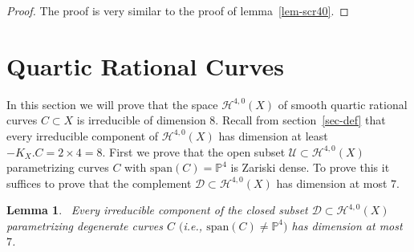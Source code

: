 \documentclass[twoside,12pt,reqno]{amsart}
\theoremstyle{plain}
\newtheorem{lem}[thm]{Lemma}
\theoremstyle{definition}
\newcommand{\Hdg}[2]{\mathcal{H}^{#1,#2}}
\newcommand{\PP}{\mathbb{P}}
\def\ps{\vspace{4pt}}
\begin{document}
\begin{proof}
The proof is very similar to the proof of lemma~\ref{lem-scr40}.  
\end{proof}

\ps

\section{Quartic Rational Curves}\label{sec-irr40} 

\ps

In this section we will prove that the space $\Hdg{4}{0}(X)$ of smooth 
quartic rational curves $C\subset X$ is irreducible of dimension $8$.
Recall from section~\ref{sec-def} that every irreducible component of
$\Hdg{4}{0}(X)$ has dimension at least $-K_X.C = 2\times 4 =8$.  First
we prove that the 
open subset $\mathcal{U}\subset \Hdg{4}{0}(X)$ parametrizing curves
$C$ with $\text{span}(C)=\PP^4$ is Zariski dense.  To prove this it
suffices to prove that the complement
$\mathcal{D}\subset\Hdg{4}{0}(X)$ has dimension at most $7$.
  
\ps

\begin{lem}~\label{lem-irr40}  Every irreducible component of the
closed subset $\mathcal{D}\subset 
\Hdg{4}{0}(X)$ parametrizing degenerate curves $C$
$($i.e., $\text{span}(C)\neq \PP^4)$ has dimension at most $7$.
\end{lem}
\end{document}
